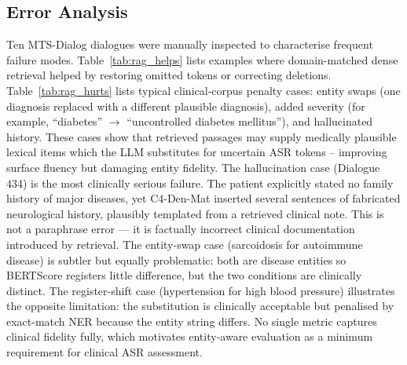 \documentclass[11pt,a4paper,twocolumn]{article}
\begin{document}
\subsection{Error Analysis}
\label{sec:error_analysis}

Ten MTS-Dialog dialogues were manually inspected to characterise frequent
failure modes. Table~\ref{tab:rag_helps} lists examples where domain-matched
dense retrieval helped by restoring omitted tokens or correcting deletions.
Table~\ref{tab:rag_hurts} lists typical clinical-corpus penalty cases: entity
swaps (one diagnosis replaced with a different plausible diagnosis), added
severity (for example, ``diabetes'' $\rightarrow$ ``uncontrolled diabetes
mellitus''), and hallucinated history. These cases show that retrieved
passages may supply medically plausible lexical items which the LLM
substitutes for uncertain ASR tokens -- improving surface fluency but damaging
entity fidelity. The hallucination case (Dialogue 434) is the most clinically serious failure. The patient explicitly stated no family history of major diseases, yet C4-Den-Mat inserted several sentences of fabricated neurological history, plausibly templated from a retrieved clinical note. This is not a paraphrase error --- it is factually incorrect clinical documentation introduced by retrieval. The entity-swap case (sarcoidosis for autoimmune disease) is 
subtler but equally problematic: both are disease entities so BERTScore 
registers little difference, but the two conditions are clinically distinct. 
The register-shift case (hypertension for high blood pressure) illustrates 
the opposite limitation: the substitution is clinically acceptable but 
penalised by exact-match NER because the entity string differs. No single 
metric captures clinical fidelity fully, which motivates entity-aware 
evaluation as a minimum requirement for clinical ASR assessment.
\end{document}

